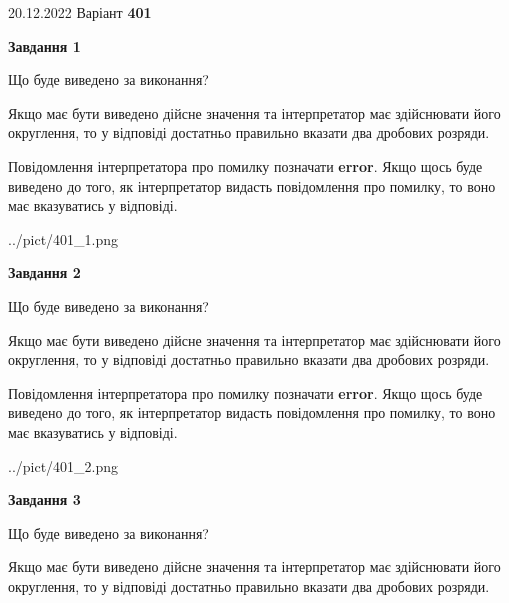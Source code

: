 \documentclass[12pt, ukrainian]{article}
\begin{document}
{20.12.2022 Варіант \No \textbf { 401 }\par}
{
\begin {Large}

{\begin {center}\textbf{Завдання 1}\end {center}}\par
Що буде виведено за виконання? \par

Якщо має бути виведено дійсне значення та інтерпретатор має здійснювати його округлення, 
то у відповіді достатньо правильно вказати два дробових розряди.

Повідомлення інтерпретатора про помилку позначати \textbf{error}.
Якщо щось буде виведено до того, як інтерпретатор видасть повідомлення про помилку, 
то воно має вказуватись у відповіді. \par

\begin{center}
	{../pict/401_1.png}
\end{center}
\newpage

{\begin {center}\textbf{Завдання 2}\end {center}}\par
Що буде виведено за виконання? \par

Якщо має бути виведено дійсне значення та інтерпретатор має здійснювати його округлення, 
то у відповіді достатньо правильно вказати два дробових розряди.

Повідомлення інтерпретатора про помилку позначати \textbf{error}.
Якщо щось буде виведено до того, як інтерпретатор видасть повідомлення про помилку, 
то воно має вказуватись у відповіді. \par

\begin{center}
	{../pict/401_2.png}
\end{center}
\newpage

{\begin {center}\textbf{Завдання 3}\end {center}}\par
Що буде виведено за виконання? \par

Якщо має бути виведено дійсне значення та інтерпретатор має здійснювати його округлення, 
то у відповіді достатньо правильно вказати два дробових розряди.


\end{Large}}
\end{document}

